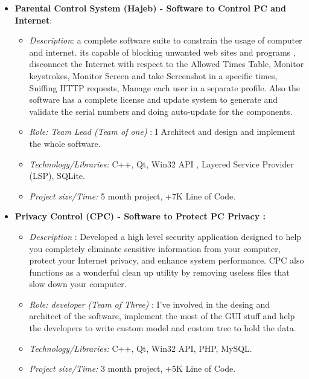 \documentclass[margin,line]{resume}
\begin{document}
\begin{resume}
\begin{itemize}
\item \textbf{Parental Control System (Hajeb) - Software to Control PC and Internet}: 
\begin{itemize}
\item \textsl{Description}: a complete software suite  to constrain the usage of computer and internet. its capable of blocking unwanted web sites and programs , disconnect the Internet with respect to the Allowed Times Table, Monitor keystrokes, Monitor Screen and take Screenshot in a specific times, Sniffing HTTP requests, Manage each user in a separate profile. Also the software has a complete license and update system to generate and validate the serial numbers and doing auto-update for the components.
 
\item  \textsl{Role: Team Lead (Team of one)} : I Architect and design and implement the whole software.

\item  \textsl{Technology/Libraries:} C++, Qt, Win32 API , Layered Service Provider (LSP), SQLite.

\item  \textsl{Project size/Time:} 5 month project,  +7K Line of Code.
\end{itemize}

\item \textbf{Privacy Control (CPC) - Software to Protect PC Privacy :}
\begin{itemize}
\item  \textsl{Description} : Developed a high level security application designed to help you completely eliminate sensitive information from your computer, protect your Internet privacy, and enhance system performance. CPC also functions as a wonderful clean up utility by removing useless files that slow down your computer. 

\item  \textsl{Role: developer (Team of Three)} : I've involved in the desing and architect of the software, implement the most of the GUI stuff and help the developers to write custom model and custom tree to hold the data.

\item  \textsl{Technology/Libraries:} C++, Qt, Win32 API, PHP, MySQL.

\item  \textsl{Project size/Time:} 3 month project,  +5K Line of Code.
\end{itemize}


\end{itemize}
\end{resume}
\end{document}
